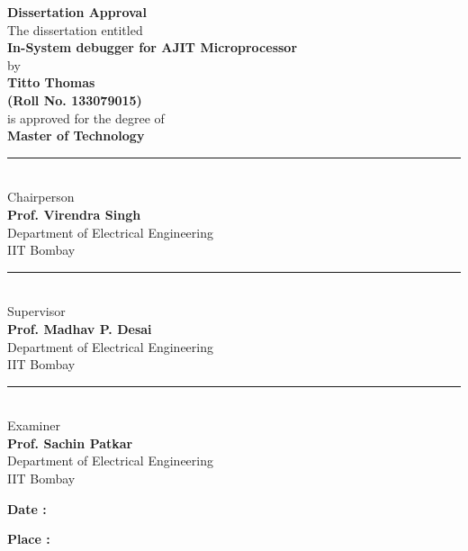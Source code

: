\begin{center}
	{\large
		\textbf{Dissertation Approval}\\
	}
	\vspace{1cm}
	The dissertation entitled\\
	\vspace{0.5cm}
	{\large
		\textbf{In-System debugger for AJIT Microprocessor}\\
	}
	\vspace{0.5cm}
	by\\
	\vspace{0.5cm}
	\textbf{Titto Thomas}\\
	\textbf{(Roll No. 133079015)}\\
	\vspace{0.5cm}
	is approved for the degree of\\
	\vspace{0.5cm}
	\textbf{Master of Technology}\\
	\vspace{1.8cm}
	
	{
		
		\noindent\rule{6cm}{0.4pt}\\
		\vspace{0.2cm}
		Chairperson\\\vspace{0.1cm}
		\textbf{Prof. Virendra Singh}\\
		Department of Electrical Engineering\\
		IIT Bombay\\
	}
	\vspace{1.8cm}


\begin{minipage}[]{.49\textwidth}
	\centering
	{
		
		\noindent\rule{6cm}{0.4pt}\\
		\vspace{0.2cm}
		Supervisor\\\vspace{0.1cm}
		\textbf{Prof. Madhav P. Desai}\\
		Department of Electrical Engineering\\
		IIT Bombay\\
	}
\end{minipage}
\begin{minipage}[]{.49\textwidth}
	\centering
	{
		
		\noindent\rule{6cm}{0.4pt}\\
		\vspace{0.2cm}
		Examiner\\\vspace{0.1cm}
		\textbf{Prof. Sachin Patkar}\\
		Department of Electrical Engineering\\
		IIT Bombay\\
	}
\end{minipage}	
	
\end{center}

\vspace{1.5cm}
\begin{minipage}[]{.3\textwidth}
\textbf{Date : }\hrulefill\\

\vspace{0.5cm}

\textbf{Place : }\hrulefill
\end{minipage}

